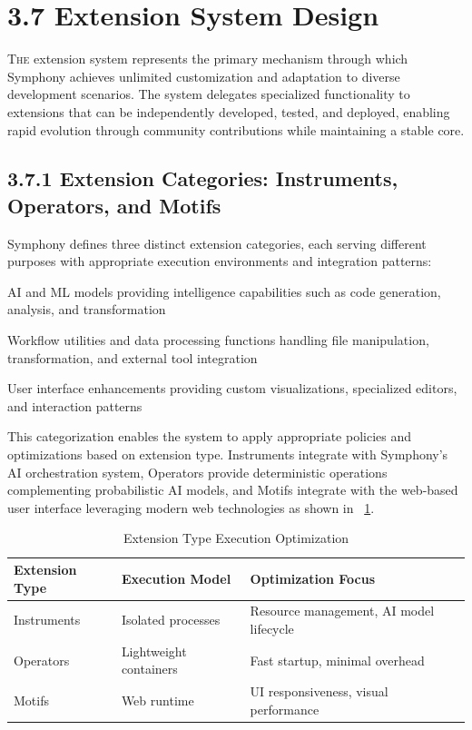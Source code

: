 \clearpage
\section{3.7 Extension System Design}
\label{sec:extension-system}

\lettrine{T}{he} extension system represents the primary mechanism through which Symphony achieves unlimited customization and adaptation to diverse development scenarios. The system delegates specialized functionality to extensions that can be independently developed, tested, and deployed, enabling rapid evolution through community contributions while maintaining a stable core.

\subsection*{3.7.1 Extension Categories: Instruments, Operators, and Motifs}

Symphony defines three distinct extension categories, each serving different purposes with appropriate execution environments and integration patterns:

\begin{description}[leftmargin=3cm,labelwidth=2.5cm]
    \item[\textbf{Instruments}] AI and ML models providing intelligence capabilities such as code generation, analysis, and transformation
    \item[\textbf{Operators}] Workflow utilities and data processing functions handling file manipulation, transformation, and external tool integration
    \item[\textbf{Motifs}] User interface enhancements providing custom visualizations, specialized editors, and interaction patterns
\end{description}

This categorization enables the system to apply appropriate policies and optimizations based on extension type. Instruments integrate with Symphony's AI orchestration system, Operators provide deterministic operations complementing probabilistic AI models, and Motifs integrate with the web-based user interface leveraging modern web technologies as shown in ~\ref{Extension Type Execution Optimization}.

\begin{table}[H]
\caption{Extension Type Execution Optimization}
\label{Extension Type Execution Optimization}
\centering
\begin{tabular}{@{}lll@{}}
\toprule
\textbf{Extension Type} & \textbf{Execution Model} & \textbf{Optimization Focus} \\
\midrule
Instruments & Isolated processes & Resource management, AI model lifecycle \\
Operators & Lightweight containers & Fast startup, minimal overhead \\
Motifs & Web runtime & UI responsiveness, visual performance \\
\bottomrule
\end{tabular}
\end{table}

